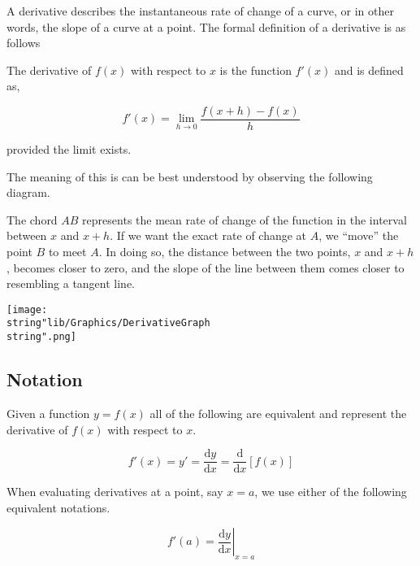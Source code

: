 \documentclass[11pt,a4paper]{book}
\begin{document}
A derivative describes the instantaneous rate of change of a curve,
or in other words, the slope of a curve at a point. The formal definition
of a derivative is as follows

\begin{tcolorbox}[colback=blue!5, colframe=black, boxrule=.4pt, sharpish corners]

The derivative of $f(x)$ with respect to $x$ is the function $f'(x)$
and is defined as,

\[
f'(x)=\lim_{h\rightarrow0}\frac{f(x+h)-f(x)}{h}
\]

provided the limit exists.
\end{tcolorbox}

The meaning of this is can be best understood by observing the following
diagram.

\begin{minipage}[t]{.5\textwidth}

The chord $AB$ represents the mean rate of change of the function
in the interval between $x$ and $x+h$. If we want the exact rate
of change at $A$, we ``move'' the point $B$ to meet $A$. In doing
so, the distance between the two points, $x$ and $x+h$, becomes
closer to zero, and the slope of the line between them comes closer
to resembling a tangent line.

\end{minipage}
\begin{minipage}[t]{.5\textwidth}
\begin{center}
\texttt{[image: \\string"lib/Graphics/DerivativeGraph\\string".png]}
\par\end{center}

\end{minipage}

\subsection{Notation}

Given a function $y=f(x)$ all of the following are equivalent and
represent the derivative of $f(x)$ with respect to $x$.

\[
f'\left(x\right)=y'=\frac{{\mathrm{d}y}}{{\mathrm{d}x}}=\frac{\mathrm{d}}{{\mathrm{d}x}}\left[f\left(x\right)\right]
\]

When evaluating derivatives at a point, say $x=a$, we use either
of the following equivalent notations.

\[
f'\left(a\right)={\left.{\frac{{\mathrm{d}y}}{{\mathrm{d}x}}}\right|_{x=a}}
\]
\end{document}

